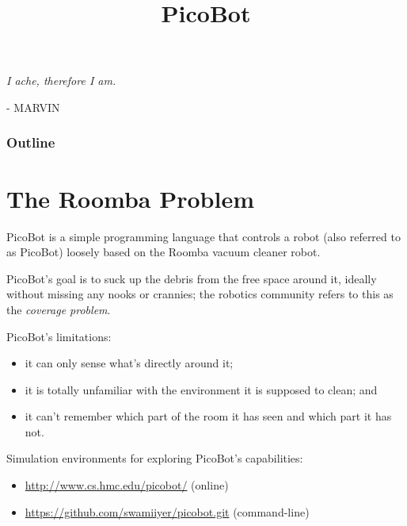 \documentclass[8pt,a4paper,compress,handout]{beamer}
\title{PicoBot}
\date{}
\begin{document}
\begin{frame}
\hfill
\begin{minipage}{150pt}
\begin{flushright}
\tiny \emph{I ache, therefore I am.} 

\smallskip

- MARVIN
\end{flushright}
\end{minipage}
\vfill
\titlepage
\end{frame}

\begin{frame}
\frametitle{Outline}
\tableofcontents
\end{frame}

\section{The Roomba Problem}
\begin{frame}[fragile]
PicoBot is a simple programming language that controls a robot (also referred to as PicoBot) loosely based on the Roomba vacuum cleaner robot.

\bigskip

PicoBot's goal is to suck up the debris from the free space around it, ideally without missing any nooks or crannies; the robotics community refers to this as the \emph{coverage problem}.

\bigskip

PicoBot's limitations:
\begin{itemize}
\item it can only sense what's directly around it; 

\item it is totally unfamiliar with the environment it is supposed to clean; and 

\item it can't remember which part of the room it has seen and which part it has not.
\end{itemize}

\bigskip

Simulation environments for exploring PicoBot's capabilities:
\begin{itemize}
\item \href{http://www.cs.hmc.edu/picobot/}{http://www.cs.hmc.edu/picobot/} (online)

\item \href{https://github.com/swamiiyer/picobot.git}{https://github.com/swamiiyer/picobot.git} (command-line)
\end{itemize}
\end{frame}
\end{document}
